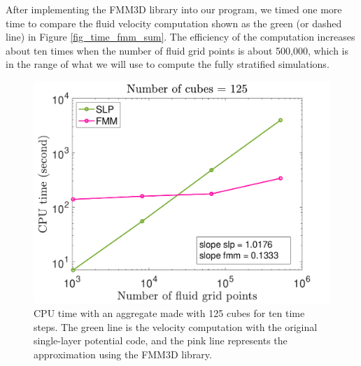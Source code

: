 After implementing the FMM3D library into our program, we timed one more time to compare the fluid velocity computation shown as the green (or dashed line) in Figure \ref{fig_time_fmm_sum}. The efficiency of the computation increases about ten times when the number of fluid grid points is about 500,000, which is in the range of what we will use to compute the fully stratified simulations.
\begin{figure}[ht]
	\begin{center}
		\includegraphics[scale=0.4]{./figures/fig_time_both_mm5_Nt10}
	\caption{CPU time with an aggregate made with 125 cubes for ten time steps. The green line is the velocity computation with the original single-layer potential code, and the pink line represents the approximation using the FMM3D library.}
	\label{fig_vel_mm5_t1}
\end{center}
\end{figure}

